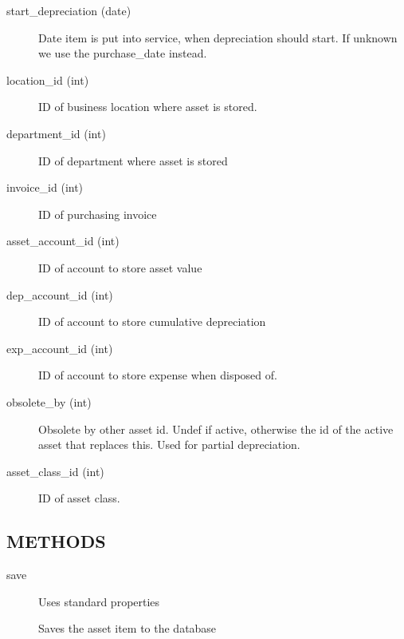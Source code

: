 \begin{description}
\begin{description}
\begin{description}
\begin{description}
\begin{description}
\begin{description}
\begin{description}
\begin{description}
\begin{description}
\begin{description}
\item[{start\_depreciation (date)}] \mbox{}

Date item is put into service, when depreciation should start.  If unknown
we use the purchase\_date instead.


\item[{location\_id (int)}] \mbox{}

ID of business location where asset is stored.


\item[{department\_id (int)}] \mbox{}

ID of department where asset is stored


\item[{invoice\_id (int)}] \mbox{}

ID of purchasing invoice


\item[{asset\_account\_id (int)}] \mbox{}

ID of account to store asset value


\item[{dep\_account\_id (int)}] \mbox{}

ID of account to store cumulative depreciation


\item[{exp\_account\_id (int)}] \mbox{}

ID of account to store expense when disposed of.


\item[{obsolete\_by (int)}] \mbox{}

Obsolete by other asset id.  Undef if active, otherwise the id of the active 
asset that replaces this. Used for partial depreciation.


\item[{asset\_class\_id (int)}] \mbox{}

ID of asset class.

\end{description}
\subsection*{METHODS\label{LedgerSMB::DBObject::Asset_METHODS}}
\begin{description}

\item[{save}] \mbox{}

Uses standard properties



Saves the asset item to the database




\end{description}
\end{description}
\end{description}
\end{description}
\end{description}
\end{description}
\end{description}
\end{description}
\end{description}
\end{description}
